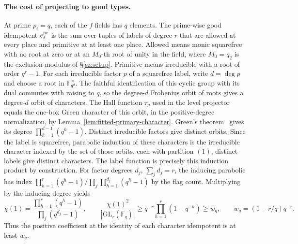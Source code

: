 \paragraph{The cost of projecting to good types.}
At prime \(p_i=q\), each of the \(f\) fields has \(q\) elements.
The prime-wise good idempotent \(e_i^{\rm pr}\) is the sum over tuples of labels
of degree \(r\) that are allowed at every place and primitive at
at least one place. Allowed means monic squarefree with no root
at zero or at an \(M_0\)-th root of unity in the field, where
\(M_0=q_2\) is the exclusion modulus of \S\ref{sz:setup}.
Primitive means irreducible with a root of order \(q^r-1\).
For each irreducible factor \(p\) of a squarefree label, write
\(d=\deg p\) and choose a root in \(\mathbb F_{q^d}^\times\).
The faithful identification of this cyclic group with its dual
commutes with raising to \(q\), so the degree-\(d\) Frobenius
orbit of roots gives a degree-\(d\) orbit of characters. The
Hall function \(\tau_p\) used in the level projector equals the one-box Green
character of this orbit, in the positive-degree normalization, by
Lemma~\ref{lem:fitted-primary-character}.
Green's theorem~\cite[\S8, Theorem~14 and p.~444]{green}
gives its degree \(\prod_{h=1}^{d-1}(q^h-1)\).
Distinct irreducible factors give distinct orbits. Since the
label is squarefree, parabolic induction of these characters is
the irreducible character indexed by the set of those orbits,
each with partition \((1)\); distinct labels give distinct characters.
The label function is precisely this induction product by construction.
For factor degrees \(d_j\), \(\sum_j d_j=r\), the inducing parabolic
has index \(\prod_{h=1}^r(q^h-1)/\prod_j\prod_{h=1}^{d_j}(q^h-1)\)
by the flag count. Multiplying by the inducing degree yields
\[
 \chi(1)=\frac{\prod_{h=1}^{r}(q^h-1)}{\prod_j(q^{d_j}-1)},
 \qquad \frac{\chi(1)^2}{|\mathrm{GL}_r(\mathbb F_q)|}
 \ge q^{-r}\prod_{h=1}^r(1-q^{-h})\ge w_q,
 \qquad w_q=(1-r/q)q^{-r}.
\]
Thus the positive coefficient at the identity of each character
idempotent is at least \(w_q\).

